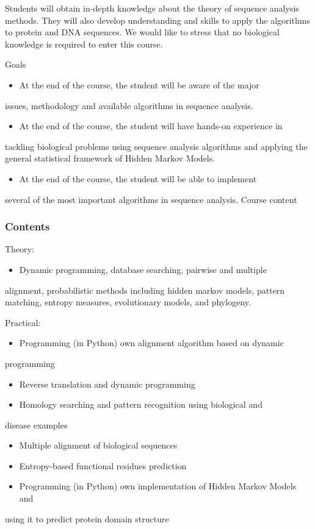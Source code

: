 \documentclass[11pt]{article}
\begin{document}
Students will obtain in-depth knowledge about the theory of sequence analysis
methods. They will also develop understanding and skills to apply the algorithms
to protein and DNA sequences. We would like to stress that no biological
knowledge is required to enter this course.

Goals
\begin{itemize}
\item At the end of the course, the student will be aware of the major
\end{itemize}
issues, methodology and available algorithms in sequence analysis.
\begin{itemize}
\item At the end of the course, the student will have hands-on experience in
\end{itemize}
tackling biological problems using sequence analysis algorithms and applying the
general statistical framework of Hidden Markov Models.
\begin{itemize}
\item At the end of the course, the student will be able to implement
\end{itemize}
several of the most important algorithms in sequence analysis. Course content

\subsubsection{Contents}
\label{sec:orgdd08a94}

Theory:
\begin{itemize}
\item Dynamic programming, database searching, pairwise and multiple
\end{itemize}
alignment, probabilistic methods including hidden markov models, pattern
matching, entropy measures, evolutionary models, and phylogeny.

Practical:
\begin{itemize}
\item Programming (in Python) own alignment algorithm based on dynamic
\end{itemize}
programming
\begin{itemize}
\item Reverse translation and dynamic programming
\item Homology searching and pattern recognition using biological and
\end{itemize}
disease examples
\begin{itemize}
\item Multiple alignment of biological sequences
\item Entropy-based functional residues prediction
\item Programming (in Python) own implementation of Hidden Markov Models and
\end{itemize}
using it to predict protein domain structure
\end{document}
